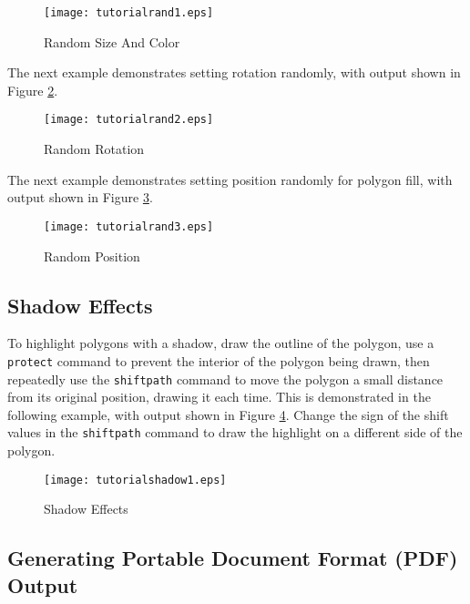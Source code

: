 

\begin{figure}[htb]
\texttt{[image: tutorialrand1.eps]}
\caption{Random Size And Color}
\label{tutorialrand1}
\end{figure}

The next example demonstrates setting rotation randomly, with output shown in
Figure \ref{tutorialrand2}.



\begin{figure}[htb]
\texttt{[image: tutorialrand2.eps]}
\caption{Random Rotation}
\label{tutorialrand2}
\end{figure}

The next example demonstrates setting position randomly for polygon fill, with
output shown in Figure \ref{tutorialrand3}.



\begin{figure}[htb]
\texttt{[image: tutorialrand3.eps]}
\caption{Random Position}
\label{tutorialrand3}
\end{figure}

\subsection{Shadow Effects}

To highlight polygons with a shadow, draw the outline of the polygon, use a
\texttt{protect} command to prevent the interior of the polygon being drawn,
then repeatedly use the \texttt{shiftpath} command to move the polygon a small
distance from its original position, drawing it each time.  This is
demonstrated in the following example, with output shown in Figure
\ref{tutorialshadow1}.  Change the sign of the shift values in the
\texttt{shiftpath} command to draw the highlight on a different side of the
polygon.



\begin{figure}[htb]
\texttt{[image: tutorialshadow1.eps]}
\caption{Shadow Effects}
\label{tutorialshadow1}
\end{figure}

\subsection{Generating Portable Document Format (PDF) Output}
\label{pdf}

